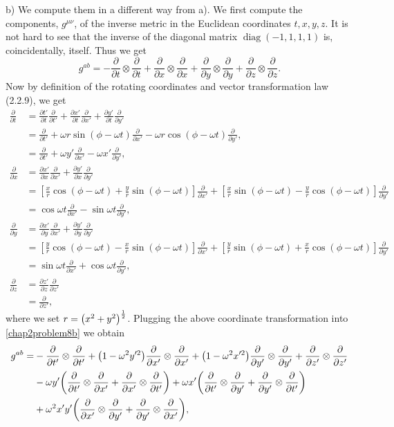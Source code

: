 \documentclass{note}
\numberwithin{equation}{chapter}
\newcommand{\pdv}[2]{\frac{\partial #1}{\partial #2}}
\begin{document}
b) We compute them in a different way from a). We first compute the components,
$g^{\mu\nu}$, of the inverse metric in the Euclidean coordinates $t, x, y, z$.
It is not hard to see that the inverse of the diagonal matrix
$\operatorname{diag}(-1, 1, 1, 1)$ is, coincidentally, itself. Thus we get
\begin{equation}
    g^{ab} = - \pdv{}{t}\otimes\pdv{}{t} + \pdv{}{x}\otimes\pdv{}{x} +
    \pdv{}{y}\otimes\pdv{}{y} + \pdv{}{z}\otimes\pdv{}{z}. \label{chap2problem8b}
\end{equation}
Now by definition of the rotating coordinates and vector transformation law
(2.2.9), we get
\begin{align*}
    \pdv{}{t}
     & = \pdv{t'}{t}\pdv{}{t'} + \pdv{x'}{t}\pdv{}{x'} + \pdv{y'}{t}\pdv{}{y'} \\
     & = \pdv{}{t'} + \omega r\sin(\phi-\omega t)\pdv{}{x'}
    - \omega r\cos(\phi-\omega t)\pdv{}{y'},                                   \\
     & = \pdv{}{t'} + \omega y'\pdv{}{x'} - \omega x'\pdv{}{y'},               \\
    \pdv{}{x}
     & = \pdv{x'}{x}\pdv{}{x'} + \pdv{y'}{x}\pdv{}{y'}                         \\
     & = \left[\frac{x}{r}\cos(\phi-\omega t) + \frac{y}{r}\sin(\phi-\omega t)
        \right]\pdv{}{x'} + \left[\frac{x}{r}\sin(\phi-\omega t) -
    \frac{y}{r}\cos(\phi-\omega t)\right]\pdv{}{y'}                            \\
     & = \cos\omega t\pdv{}{x'} - \sin\omega t\pdv{}{y'},                      \\
    \pdv{}{y}
     & = \pdv{x'}{y}\pdv{}{x'} + \pdv{y'}{y}\pdv{}{y'}                         \\
     & = \left[\frac{y}{r}\cos(\phi-\omega t) - \frac{x}{r}\sin(\phi-\omega t)
        \right]\pdv{}{x'} + \left[\frac{y}{r}\sin(\phi-\omega t) +
    \frac{x}{r}\cos(\phi-\omega t)\right]\pdv{}{y'}                            \\
     & = \sin\omega t\pdv{}{x'} + \cos\omega t\pdv{}{y'},                      \\
    \pdv{}{z}
     & = \pdv{z'}{z}\pdv{}{z'}                                                 \\
     & = \pdv{}{z'},
\end{align*}
where we set $r = \prn{x^2+y^2}^{\frac12}$. Plugging the above coordinate
transformation into \eqref{chap2problem8b} we obtain
\begin{align*}
    g^{ab} =
     & - \pdv{}{t'}\otimes\pdv{}{t'} + \prn{1-\omega^2y'^2}\pdv{}{x'}
    \otimes\pdv{}{x'} + \prn{1-\omega^2x'^2}\pdv{}{y'}\otimes\pdv{}{y'} +
    \pdv{}{z'}\otimes\pdv{}{z'}                                        \\
     & - \omega y'\prn{\pdv{}{t'}\otimes\pdv{}{x'} + \pdv{}{x'}\otimes
        \pdv{}{t'}} + \omega x'\prn{\pdv{}{t'}\otimes\pdv{}{y'} +
    \pdv{}{y'}\otimes\pdv{}{t'}}                                       \\
     & + \omega^2x'y'\prn{\pdv{}{x'}\otimes\pdv{}{y'} +
        \pdv{}{y'}\otimes\pdv{}{x'}},
\end{align*}
\end{document}
